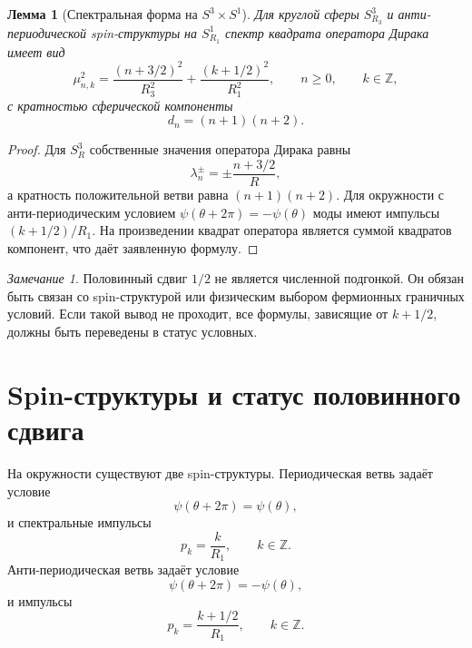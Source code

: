 \documentclass[12pt,a4paper]{report}
\newtheorem{lemma}{Лемма}[chapter]
\theoremstyle{remark}
\newtheorem{remark}{Замечание}[chapter]
\begin{document}
\begin{lemma}[Спектральная форма на \(S^3\times S^1\)]
Для круглой сферы \(S^3_{R_3}\) и анти-периодической spin-структуры на \(S^1_{R_1}\) спектр квадрата оператора Дирака имеет вид
\begin{equation}
    \mu_{n,k}^2
    =\frac{(n+3/2)^2}{R_3^2}
    +\frac{(k+1/2)^2}{R_1^2},
    \qquad n\geq 0,
    \qquad k\in\mathbb{Z},
\end{equation}
с кратностью сферической компоненты
\begin{equation}
    d_n=(n+1)(n+2).
\end{equation}
\end{lemma}

\begin{proof}
Для \(S^3_R\) собственные значения оператора Дирака равны
\begin{equation}
    \lambda_n^{\pm}=\pm\frac{n+3/2}{R},
\end{equation}
а кратность положительной ветви равна \((n+1)(n+2)\). Для окружности с анти-периодическим условием \(\psi(\theta+2\pi)=-\psi(\theta)\) моды имеют импульсы \((k+1/2)/R_1\). На произведении квадрат оператора является суммой квадратов компонент, что даёт заявленную формулу.
\end{proof}

\begin{remark}
Половинный сдвиг \(1/2\) не является численной подгонкой. Он обязан быть связан со spin-структурой или физическим выбором фермионных граничных условий. Если такой вывод не проходит, все формулы, зависящие от \(k+1/2\), должны быть переведены в статус условных.
\end{remark}

\section{Spin-структуры и статус половинного сдвига}

На окружности существуют две spin-структуры. Периодическая ветвь задаёт условие
\begin{equation}
    \psi(\theta+2\pi)=\psi(\theta),
\end{equation}
и спектральные импульсы
\begin{equation}
    p_k=\frac{k}{R_1},
    \qquad k\in\mathbb{Z}.
\end{equation}
Анти-периодическая ветвь задаёт условие
\begin{equation}
    \psi(\theta+2\pi)=-\psi(\theta),
\end{equation}
и импульсы
\begin{equation}
    p_k=\frac{k+1/2}{R_1},
    \qquad k\in\mathbb{Z}.
\end{equation}
\end{document}
